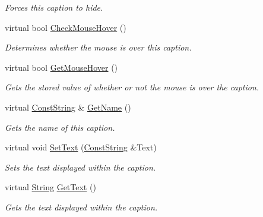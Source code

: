 \begin{DoxyCompactItemize}
\begin{DoxyCompactList}\small\item\em Forces this caption to hide. \item\end{DoxyCompactList}\item 
virtual bool \hyperlink{classphys_1_1UI_1_1Caption_a3dc84a08ea80de8d75e9614decbad605}{CheckMouseHover} ()
\begin{DoxyCompactList}\small\item\em Determines whether the mouse is over this caption. \item\end{DoxyCompactList}\item 
virtual bool \hyperlink{classphys_1_1UI_1_1Caption_afdb8c018e33bc28c77291ea797c042c0}{GetMouseHover} ()
\begin{DoxyCompactList}\small\item\em Gets the stored value of whether or not the mouse is over the caption. \item\end{DoxyCompactList}\item 
virtual \hyperlink{namespacephys_a5ce5049f8b4bf88d6413c47b504ebb31}{ConstString} \& \hyperlink{classphys_1_1UI_1_1Caption_ac189115176b58b77b32b5b61fe8fec1b}{GetName} ()
\begin{DoxyCompactList}\small\item\em Gets the name of this caption. \item\end{DoxyCompactList}\item 
virtual void \hyperlink{classphys_1_1UI_1_1Caption_a4592228fd6874958e6767b9d461ac2ce}{SetText} (\hyperlink{namespacephys_a5ce5049f8b4bf88d6413c47b504ebb31}{ConstString} \&Text)
\begin{DoxyCompactList}\small\item\em Sets the text displayed within the caption. \item\end{DoxyCompactList}\item 
virtual \hyperlink{namespacephys_aa03900411993de7fbfec4789bc1d392e}{String} \hyperlink{classphys_1_1UI_1_1Caption_ad35be48f6f9df9ca9d9a2e3d0cb99c78}{GetText} ()
\begin{DoxyCompactList}\small\item\em Gets the text displayed within the caption. \item\end{DoxyCompactList}\item 

\end{DoxyCompactItemize}
